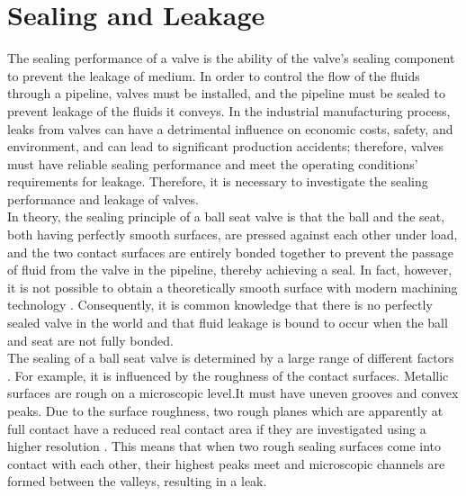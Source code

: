 \section{Sealing and Leakage}
\label{Sealing and Leakage}
The sealing performance of a valve is the ability of the valve's sealing component to prevent the leakage 
of medium. In order to control the flow of the fluids through a pipeline, valves must be installed, and 
the pipeline must be sealed to prevent leakage of the fluids it conveys. In the industrial manufacturing 
process, leaks from valves can have a detrimental influence on economic costs, safety, and environment, 
and can lead to significant production accidents; therefore, valves must have reliable sealing performance 
and meet the operating conditions' requirements 
for leakage. Therefore, it is necessary to investigate the sealing performance and leakage of valves.\\

In theory, the sealing principle of a ball seat valve is that the ball and the seat, both having 
perfectly smooth surfaces, are pressed against each other under load, and the two contact surfaces are 
entirely bonded together to prevent the passage of fluid from the valve in the pipeline, thereby achieving
a seal. In fact, however, it is not possible to obtain a theoretically smooth surface with 
modern machining technology \cite{Sealing1}. Consequently, it is common knowledge that there is no perfectly sealed valve in the world 
and that fluid leakage is bound to occur when the ball and seat are not fully bonded.\\

The sealing of a ball seat valve is determined by a large range of different factors \cite{fischer2021influence}.
For example, it is influenced by the roughness of the contact surfaces. Metallic surfaces are rough 
on a microscopic level.It must have uneven grooves and convex peaks. Due to the surface roughness, two rough 
planes which are apparently at full contact have a reduced real contact area if they 
are investigated using a higher resolution \cite{fischer2021geometry}. This means that when two 
rough sealing surfaces come into contact with each other,
 their highest peaks meet and microscopic channels are formed between the valleys, resulting in a leak.\\


